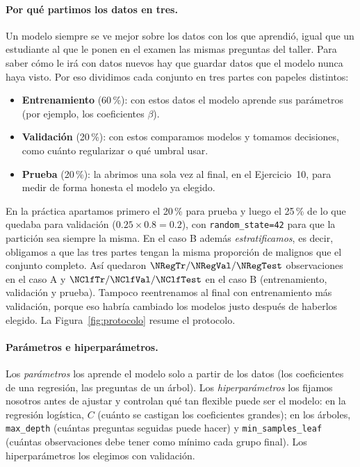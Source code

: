 \paragraph{Por qué partimos los datos en tres.}
Un modelo siempre se ve mejor sobre los datos con los que aprendió, igual
que un estudiante al que le ponen en el examen las mismas preguntas del
taller. Para saber cómo le irá con datos nuevos hay que guardar datos que
el modelo nunca haya visto. Por eso dividimos cada conjunto en tres partes
con papeles distintos:
\begin{itemize}
    \item \textbf{Entrenamiento} (60\,\%): con estos datos el modelo aprende
    sus parámetros (por ejemplo, los coeficientes $\beta$).
    \item \textbf{Validación} (20\,\%): con estos comparamos modelos y
    tomamos decisiones, como cuánto regularizar o qué umbral usar.
    \item \textbf{Prueba} (20\,\%): la abrimos una sola vez al final, en el
    Ejercicio~10, para medir de forma honesta el modelo ya elegido.
\end{itemize}
En la práctica apartamos primero el 20\,\% para prueba y luego el 25\,\% de
lo que quedaba para validación ($0.25\times0.8=0.2$), con
\texttt{random\_state=42} para que la partición sea siempre la misma. En el
caso B además \emph{estratificamos}, es decir, obligamos a que las tres
partes tengan la misma proporción de malignos que el conjunto completo.
Así quedaron $\NRegTr/\NRegVal/\NRegTest$ observaciones en el caso A y
$\NClfTr/\NClfVal/\NClfTest$ en el caso B (entrenamiento, validación y
prueba). Tampoco reentrenamos al final con entrenamiento más validación,
porque eso habría cambiado los modelos justo después de haberlos elegido.
La Figura~\ref{fig:protocolo} resume el protocolo.

\paragraph{Parámetros e hiperparámetros.}
Los \emph{parámetros} los aprende el modelo solo a partir de los datos (los
coeficientes de una regresión, las preguntas de un árbol). Los
\emph{hiperparámetros} los fijamos nosotros antes de ajustar y controlan
qué tan flexible puede ser el modelo: en la regresión logística, $C$
(cuánto se castigan los coeficientes grandes); en los árboles,
\texttt{max\_depth} (cuántas preguntas seguidas puede hacer) y
\texttt{min\_samples\_leaf} (cuántas observaciones debe tener como mínimo
cada grupo final). Los hiperparámetros los elegimos con validación.


